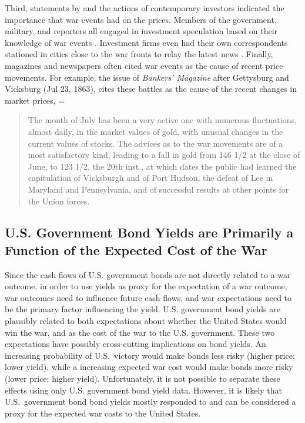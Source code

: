 Third, statements by and the actions of contemporary investors indicated the importance that war events had on the prices. %
Members of the government, military, and reporters all engaged in investment speculation based on their knowledge of war events \parencites[5-7]{Cornwallis1879}{Mitchell1903}[][1004]{WillardGuinnaneEtAl1996}.
Investment firms even had their own correspondents stationed in cities close to the war fronts to relay the latest news \parencites[5-7]{Cornwallis1879}. %
Finally, magazines and newspapers often cited war events as the cause of recent price movements. %
For example, the issue of \textit{Bankers' Magazine} after Gettysburg and Vicksburg (Jul 23, 1863), cites these battles as the cause of the recent changes in market prices,
=\begin{quote}
  The month of July has been a very active one with numerous fluctuations, almost daily, in the market values of gold, with unusual changes in the current values of stocks. %
  The advices as to the war movements are of a most satisfactory kind, leading to a fall in gold from 146 1/2 at the close of June, to 123 1/2, the 20th inst., at which dates the public had learned the  capitulation of Vicksburgh and of Port Hudson, the defeat of Lee in  Maryland and Pennsylvania, and of successful results at other points  for the Union forces. %
\parencite[159]{BankersMagazine1864}
\end{quote}



\subsection{U.S. Government Bond Yields are Primarily a Function of the Expected Cost of the War}
\label{sec:u.s.-governm-inter}

Since the cash flows of U.S. government bonds are not directly related to a war outcome, in order to use yields as proxy for the expectation of a war outcome, war outcomes need to influence future cash flows, and war expectations need to be the primary factor influencing the yield.
U.S. government bond yields are plausibly related to both expectations about whether the United States would win the war, and as the cost of the war to the U.S. government.
These two expectations have possibly cross-cutting implications on bond yields.
An increasing probability of U.S.\ victory would make bonds less risky (higher price; lower yield), while a increasing expected war cost would make bonds more risky (lower price; higher yield).
Unfortunately, it is not possible to separate these effects using only U.S. government bond yield data.
However, it is likely that U.S.\ government bond bond yields mostly responded to and can be considered a proxy for the expected war costs to the United States.


